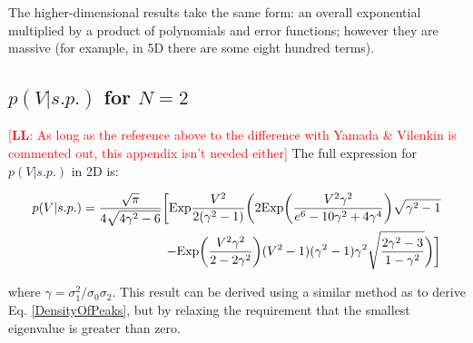 \documentclass[12pt]{article}
\newcommand{\lfl}[1]{\textcolor{red}{[{\bf LL}: #1]}}
\begin{document}
The higher-dimensional results take the same form: an overall exponential multiplied by a product of polynomials and error functions; however they are massive (for example, in 5D there are some eight hundred terms).

\subsection{$p(V|s.p.)$ for $N=2$}
\lfl{As long as the reference above to the difference with Yamada \& Vilenkin is commented out, this appendix isn't needed either}
The full expression for $p(V|s.p.)$ in 2D is:

\begin{equation}
\begin{split}
p(V|s.p.)=\frac{\sqrt{\pi}}{4\sqrt{4\gamma^2-6}}\bigg{[}\mathrm{Exp}\frac{V^2}{2(\gamma^2-1)}\bigg{(}2\mathrm{Exp}\bigg{(}\frac{V^2\gamma^2}{e^6-10\gamma^2+4\gamma^4}\bigg{)}\sqrt{\gamma^2-1}\\
-\mathrm{Exp}\bigg{(}\frac{V^2\gamma^2}{2-2\gamma^2}\bigg{)}(V^2-1)(\gamma^2-1)\gamma^2\sqrt{\frac{2\gamma^2-3}{1-\gamma^2}}\bigg{)}\bigg{]}
\end{split}
\end{equation}

\noindent where $\gamma = \sigma_1^2/\sigma_0\sigma_2$. This result can be derived using a similar method as to derive Eq. \ref{DensityOfPeaks}, but by relaxing the requirement that the smallest eigenvalue is greater than zero.
\end{document}
